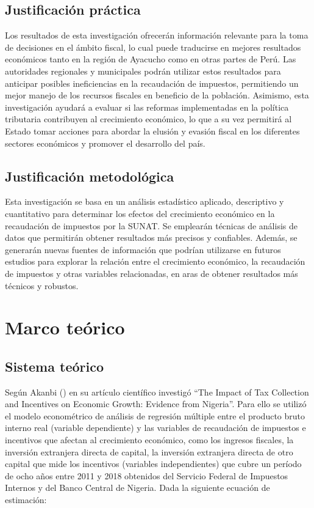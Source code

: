 \documentclass[
  jou,
  floatsintext,
  longtable,
  a4paper,
  nolmodern,
  notxfonts,
  notimes,
  12pt,
  colorlinks=true,linkcolor=blue,citecolor=blue,urlcolor=blue]{apa7}
\begin{document}
\subsection{Justificación
práctica}\label{sec-justificaciuxf3n-pruxe1ctica}

Los resultados de esta investigación ofrecerán información relevante
para la toma de decisiones en el ámbito fiscal, lo cual puede traducirse
en mejores resultados económicos tanto en la región de Ayacucho como en
otras partes de Perú. Las autoridades regionales y municipales podrán
utilizar estos resultados para anticipar posibles ineficiencias en la
recaudación de impuestos, permitiendo un mejor manejo de los recursos
fiscales en beneficio de la población. Asimismo, esta investigación
ayudará a evaluar si las reformas implementadas en la política
tributaria contribuyen al crecimiento económico, lo que a su vez
permitirá al Estado tomar acciones para abordar la elusión y evasión
fiscal en los diferentes sectores económicos y promover el desarrollo
del país.

\subsection{Justificación
metodológica}\label{sec-justificaciuxf3n-metodoluxf3gica}

Esta investigación se basa en un análisis estadístico aplicado,
descriptivo y cuantitativo para determinar los efectos del crecimiento
económico en la recaudación de impuestos por la SUNAT. Se emplearán
técnicas de análisis de datos que permitirán obtener resultados más
precisos y confiables. Además, se generarán nuevas fuentes de
información que podrían utilizarse en futuros estudios para explorar la
relación entre el crecimiento económico, la recaudación de impuestos y
otras variables relacionadas, en aras de obtener resultados más técnicos
y robustos.

\section{Marco teórico}\label{sec-marco-teuxf3rico}

\subsection{Sistema teórico}\label{sec-sistema-teuxf3rico}

Según Akanbi () en su artículo
científico investigó ``The Impact of Tax Collection and Incentives on
Economic Growth: Evidence from Nigeria''. Para ello se utilizó el modelo
econométrico de análisis de regresión múltiple entre el producto bruto
interno real (variable dependiente) y las variables de recaudación de
impuestos e incentivos que afectan al crecimiento económico, como los
ingresos fiscales, la inversión extranjera directa de capital, la
inversión extranjera directa de otro capital que mide los incentivos
(variables independientes) que cubre un período de ocho años entre 2011
y 2018 obtenidos del Servicio Federal de Impuestos Internos y del Banco
Central de Nigeria. Dada la siguiente ecuación de estimación:
\end{document}
